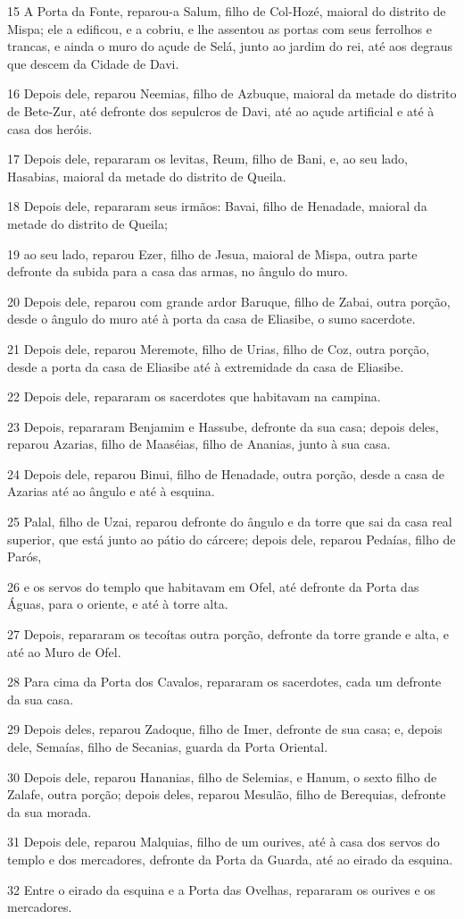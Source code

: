\par 15 A Porta da Fonte, reparou-a Salum, filho de Col-Hozé, maioral do distrito de Mispa; ele a edificou, e a cobriu, e lhe assentou as portas com seus ferrolhos e trancas, e ainda o muro do açude de Selá, junto ao jardim do rei, até aos degraus que descem da Cidade de Davi.
\par 16 Depois dele, reparou Neemias, filho de Azbuque, maioral da metade do distrito de Bete-Zur, até defronte dos sepulcros de Davi, até ao açude artificial e até à casa dos heróis.
\par 17 Depois dele, repararam os levitas, Reum, filho de Bani, e, ao seu lado, Hasabias, maioral da metade do distrito de Queila.
\par 18 Depois dele, repararam seus irmãos: Bavai, filho de Henadade, maioral da metade do distrito de Queila;
\par 19 ao seu lado, reparou Ezer, filho de Jesua, maioral de Mispa, outra parte defronte da subida para a casa das armas, no ângulo do muro.
\par 20 Depois dele, reparou com grande ardor Baruque, filho de Zabai, outra porção, desde o ângulo do muro até à porta da casa de Eliasibe, o sumo sacerdote.
\par 21 Depois dele, reparou Meremote, filho de Urias, filho de Coz, outra porção, desde a porta da casa de Eliasibe até à extremidade da casa de Eliasibe.
\par 22 Depois dele, repararam os sacerdotes que habitavam na campina.
\par 23 Depois, repararam Benjamim e Hassube, defronte da sua casa; depois deles, reparou Azarias, filho de Maaséias, filho de Ananias, junto à sua casa.
\par 24 Depois dele, reparou Binui, filho de Henadade, outra porção, desde a casa de Azarias até ao ângulo e até à esquina.
\par 25 Palal, filho de Uzai, reparou defronte do ângulo e da torre que sai da casa real superior, que está junto ao pátio do cárcere; depois dele, reparou Pedaías, filho de Parós,
\par 26 e os servos do templo que habitavam em Ofel, até defronte da Porta das Águas, para o oriente, e até à torre alta.
\par 27 Depois, repararam os tecoítas outra porção, defronte da torre grande e alta, e até ao Muro de Ofel.
\par 28 Para cima da Porta dos Cavalos, repararam os sacerdotes, cada um defronte da sua casa.
\par 29 Depois deles, reparou Zadoque, filho de Imer, defronte de sua casa; e, depois dele, Semaías, filho de Secanias, guarda da Porta Oriental.
\par 30 Depois dele, reparou Hananias, filho de Selemias, e Hanum, o sexto filho de Zalafe, outra porção; depois deles, reparou Mesulão, filho de Berequias, defronte da sua morada.
\par 31 Depois dele, reparou Malquias, filho de um ourives, até à casa dos servos do templo e dos mercadores, defronte da Porta da Guarda, até ao eirado da esquina.
\par 32 Entre o eirado da esquina e a Porta das Ovelhas, repararam os ourives e os mercadores.

